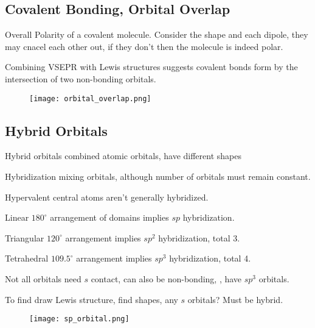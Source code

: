 \begin{mdframed}
\subsection{Covalent Bonding, Orbital Overlap}
\begin{multicols}{2}
\begin{compactdesc}
\item[Overall Polarity] of a covalent molecule. Consider the shape and each
    dipole, they may cnacel each other out, if they don't then the molecule is
    indeed polar.
\item[Combining VSEPR with Lewis] structures suggests covalent bonds form by
    the intersection of two non-bonding orbitals.
\end{compactdesc}
\begin{figure}[H]
\centering
\texttt{[image: orbital\_overlap.png]}
\end{figure}

\end{multicols}



\end{mdframed}




\begin{mdframed}
\subsection{Hybrid Orbitals}
\begin{multicols}{2}
\begin{compactdesc}
\item[Hybrid orbitals] combined atomic orbitals, have different shapes
\item[Hybridization] mixing orbitals, although number of orbitals must remain
    constant.
\item[Hypervalent] central atoms aren't generally hybridized.
\item[Linear $180^\circ$] arrangement of domains implies $sp$ hybridization.
\item[Triangular $120^\circ$] arrangement implies $sp^2$ hybridization, total 3.
\item[Tetrahedral $109.5^\circ$] arrangement implies $sp^3$ hybridization, total 4.
\item[Not all orbitals] need $s$ contact, can also be non-bonding, ,
     have $sp^3$ orbitals.
\item[To find] draw Lewis structure, find shapes, any $s$ orbitals? Must be
    hybrid.
\end{compactdesc}
\end{multicols}
\begin{figure}[H]
\centering
\texttt{[image: sp\_orbital.png]}
\end{figure}

\end{mdframed}




